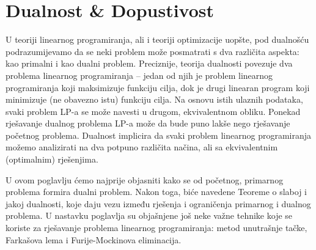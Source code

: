 \documentclass[a4paper, utf8, 11pt, colorlinks]{book}
\theoremstyle{definition}
\begin{document}

 \chapter{Dualnost \& Dopustivost}\label{chp:dualnost}
 
 U teoriji linearnog programiranja, ali i teoriji optimizacije uopšte, pod dualnošću podrazumijevamo da se neki problem može posmatrati s dva različita aspekta: kao primalni i kao dualni problem. 
Preciznije, teorija dualnosti povezuje dva problema linearnog programiranja -- jedan od njih je problem linearnog programiranja koji maksimizuje funkciju cilja, dok je drugi linearan program  koji minimizuje (ne obavezno istu) funkciju cilja.  Na osnovu istih ulaznih podataka, svaki problem LP-a se može navesti u drugom, ekvivalentnom obliku. Ponekad rješavanje dualnog problema LP-a može da bude puno lakše nego rješavanje početnog problema.  Dualnost implicira da svaki problem linearnog programiranja možemo analizirati na dva potpuno različita načina, ali sa ekvivalentnim (optimalnim) rješenjima. 

U ovom poglavlju ćemo najprije objasniti kako se od početnog, primarnog problema formira dualni problem. Nakon toga, biće navedene Teoreme o slaboj i jakoj dualnosti, koje daju vezu između rješenja i ograničenja primarnog i dualnog problema. U nastavku poglavlja su objašnjene još neke važne tehnike koje se koriste za rješavanje problema linearnog programiranja: metod unutrašnje tačke, Farkašova lema i Furije-Mockinova eliminacija.
 
\end{document}
